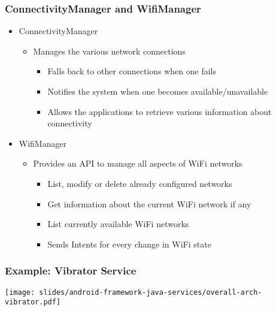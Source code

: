 \begin{frame}
  \frametitle{ConnectivityManager and WifiManager}
  \begin{itemize}
  \item ConnectivityManager
    \begin{itemize}
    \item Manages the various network connections
      \begin{itemize}
      \item Falls back to other connections when one fails
      \item Notifies the system when one becomes available/unavailable
      \item Allows the applications to retrieve various information
        about connectivity
      \end{itemize}
    \end{itemize}
  \item WifiManager
    \begin{itemize}
    \item Provides an API to manage all aspects of WiFi networks
      \begin{itemize}
      \item List, modify or delete already configured networks
      \item Get information about the current WiFi network if any
      \item List currently available WiFi networks
      \item Sends Intents for every change in WiFi state
      \end{itemize}
    \end{itemize}
  \end{itemize}
\end{frame}

\begin{frame}
  \frametitle{Example: Vibrator Service}
  \begin{center}
    \texttt{[image: slides/android-framework-java-services/overall-arch-vibrator.pdf]}
  \end{center}
\end{frame}
